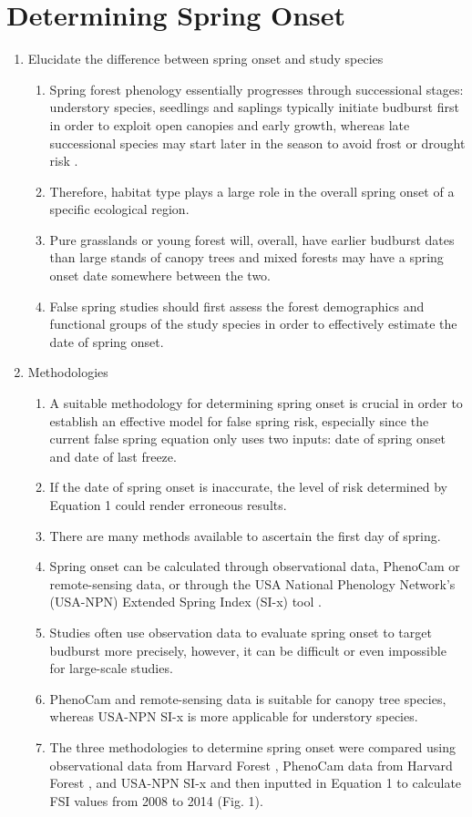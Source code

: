 \documentclass{article}\usepackage[]{graphicx}\usepackage[]{color}
\begin{document}
\section*{Determining Spring Onset}
\begin{enumerate}
\item Elucidate the difference between spring onset and study species
\begin{enumerate}
\item Spring forest phenology essentially progresses through successional stages: understory species, seedlings and saplings typically initiate budburst first in order to exploit open canopies and early growth, whereas late successional species may start later in the season to avoid frost or drought risk \citep{Richardson2009, Xin2016}.
\item Therefore, habitat type plays a large role in the overall spring onset of a specific ecological region. 
\item Pure grasslands or young forest will, overall, have earlier budburst dates than large stands of canopy trees and mixed forests may have a spring onset date somewhere between the two.
\item False spring studies should first assess the forest demographics and functional groups of the study species in order to effectively estimate the date of spring onset.
\end{enumerate}
\item Methodologies
\begin{enumerate}
\item A suitable methodology for determining spring onset is crucial in order to establish an effective model for false spring risk, especially since the current false spring equation only uses two inputs: date of spring onset and date of last freeze. 
\item If the date of spring onset is inaccurate, the level of risk determined by Equation 1 could render erroneous results. 
\item There are many methods available to ascertain the first day of spring.
\item Spring onset can be calculated through observational data, PhenoCam or remote-sensing data, or through the USA National Phenology Network's (USA-NPN) Extended Spring Index (SI-x) tool \citep{USA-NPN2016}.
\item Studies often use observation data to evaluate spring onset to target budburst more precisely, however, it can be difficult or even impossible for large-scale studies. 
\item PhenoCam and remote-sensing data is suitable for canopy tree species, whereas USA-NPN SI-x is more applicable for understory species. 
\item The three methodologies to determine spring onset were compared using observational data from Harvard Forest \citep{Okeefe2014}, PhenoCam data from Harvard Forest \citep{Richardson2015}, and USA-NPN SI-x \citep{USA-NPN2016} and then inputted in Equation 1 to calculate FSI values from 2008 to 2014 (Fig. 1).



\end{enumerate}
\end{enumerate}
\end{document}
